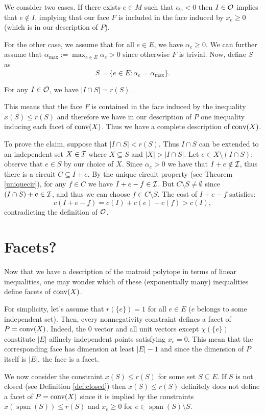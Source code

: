 \documentclass[12pt]{article}
\newcommand{\spa}{\operatorname{span}}
\begin{document}
We consider two cases. If there exists $e\in M$ such that $\alpha_e<
0$ then $I\in {\cal O}$ implies that $e\notin I$, implying that our
face $F$ is included in the face induced by $x_e\geq 0$ (which is in
our description of $P$). 

For the other case, we assume that for all $e\in E$, we have
$\alpha_e\geq 0$. We can further assume that
$\alpha_{\max}:=\max_{e\in E}\alpha_e>0$ since otherwise $F$ is
trivial. Now, define $S$ as
$$S=\{e\in E: \alpha_e =\alpha_{\max}\}.$$ 
\begin{claim}
For any $I\in {\cal O}$, we have $|I\cap S|=r(S)$.
\end{claim}
This means that the face $F$ is contained in the face induced by the
inequality $x(S)\leq r(S)$ and therefore we have in our description of
$P$ one inequality
inducing each facet of $\operatorname{conv}(X)$. Thus we have a complete description
of $\operatorname{conv}(X)$. 

To prove the claim, suppose that $|I\cap S|<r(S)$. Thus $I\cap S$ can be extended to an
independent set $X\in {\cal I}$ where $X\subseteq S$ and $|X|>|I\cap
S|$. Let $e\in X\setminus (I\cap S)$; observe that $e\in S$ by our
choice of $X$. Since $\alpha_e>0$ we have that $I+e\notin {\cal I}$,
thus there is a circuit $C\subseteq I+e$. By the unique circuit
property (see Theorem \ref{uniquecir}), for any $f\in C$ we have
$I+e-f\in {\cal I}$. But $C\setminus S\neq \emptyset$ since $(I\cap S)
+e\in {\cal I}$, and thus we can choose $f\in C\setminus S$. The cost
of $I+e-f$ satisfies:
$$c(I+e-f)=c(I)+c(e)-c(f)>c(I),$$ contradicting the definition of
${\cal O}$.   

\section{Facets?}
Now that we have a description of the matroid polytope in terms of
linear inequalities, one may wonder which of these (exponentially
many) inequalities define facets of $\operatorname{conv}(X)$. 

For simplicity, let's assume that $r(\{e\})=1$ for all $e\in E$ ($e$
belongs to some independent set). Then, every nonnegativity constraint
defines a facet of $P=\operatorname{conv}(X)$. Indeed, the 0 vector and all unit
vectors except $\chi(\{e\})$ constitute $|E|$ affinely independent
points satisfying $x_e=0$. This mean that the corresponding face has
dimension at least $|E|-1$  and since the dimension of $P$ itself is
$|E|$, the face is a facet. 

We now consider the constraint $x(S)\leq r(S)$ for some set
$S\subseteq E$. If $S$ is not closed (see Definition \ref{def:closed})
then $x(S)\leq r(S)$ definitely does not define a facet of $P=\operatorname{conv}(X)$
since it is implied by the constraints $x(\spa(S))\leq r(S)$ and
$x_e\geq 0$ for $e\in \spa(S)\setminus S$. 
\end{document}
